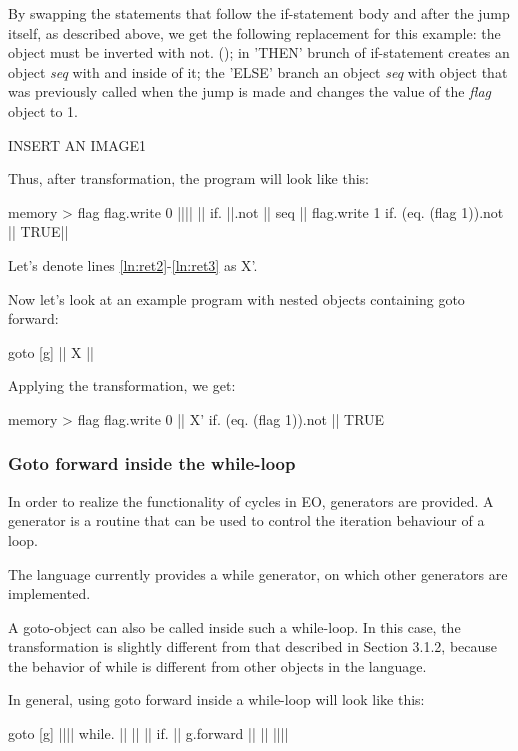 \documentclass[sigplan,review,11pt,nonacm,natbib=false]{acmart}
\begin{document}
By swapping the statements that follow the if-statement body and after the jump itself, as described above, we get the following replacement for this example: the  object must be inverted with not. (); in 'THEN' brunch of if-statement creates an object \emph{seq} with  and  inside of it; the 'ELSE' branch an object \emph{seq} with  object that was previously called when the jump is made and changes the value of the \emph{flag} object to 1.

{INSERT AN IMAGE1}

Thus, after transformation, the program will look like this:
\begin{ffcode}
memory > flag
flag.write 0
|||$\label{ln:ret2}$|
  ||
  if.
    ||.not
    ||
    seq
      ||
      flag.write 1
  if.
    (eq. (flag 1)).not
    ||
    TRUE|$\label{ln:ret3}$|
\end{ffcode}

Let's denote lines \ref{ln:ret2}-\ref{ln:ret3} as X'.

Now let's look at an example program with nested objects containing goto forward:
\begin{ffcode}
goto
  [g]
    ||
      X
      ||
\end{ffcode}

Applying the transformation, we get:
\begin{ffcode}
memory > flag
flag.write 0
||
  X'
  if.
    (eq. (flag 1)).not
    ||
    TRUE
\end{ffcode}


\subsubsection{Goto forward inside the while-loop}
In order to realize the functionality of cycles in EO, generators are provided. A generator is a routine that can be used to control the iteration behaviour of a loop.

The language currently provides a while generator, on which other generators are implemented.

A goto-object can also be called inside such a while-loop. In this case, the transformation is slightly different from that described in Section 3.1.2, because the behavior of while is different from other objects in the language.

In general, using goto forward inside a while-loop will look like this:
\begin{ffcode}
goto
  [g]
    |||$\label{ln:ret4}$|
      while.
        ||
        ||
          ||
          if.
            ||
            g.forward ||
            ||
          |||$\label{ln:ret5}$|
\end{ffcode}
\end{document}
